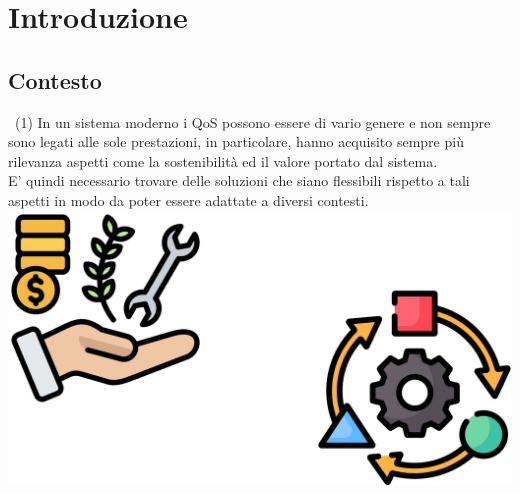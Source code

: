 \documentclass[compress]{beamer}
\begin{document}
\begin{frame}[plain]
    \titlepage
\end{frame}

\section{Introduzione}

\subsection{Contesto}
\begin{frame}{\subsecname\ (1)}
    In un sistema moderno i QoS possono essere di vario genere e non sempre sono legati alle sole prestazioni, in particolare, hanno acquisito sempre più rilevanza aspetti come la sostenibilità ed il valore portato dal sistema.\\ E' quindi necessario trovare delle soluzioni che siano flessibili rispetto a tali aspetti in modo da poter essere adattate a diversi contesti.
    \vspace{2cm}
    \begin{adjustbox}{margin=0.4cm 0cm 0cm 0.65cm, center} %
        \includegraphics[width=.6\textwidth]{figs/qos_adapt.png}
    \end{adjustbox}
\end{frame}
\end{document}
